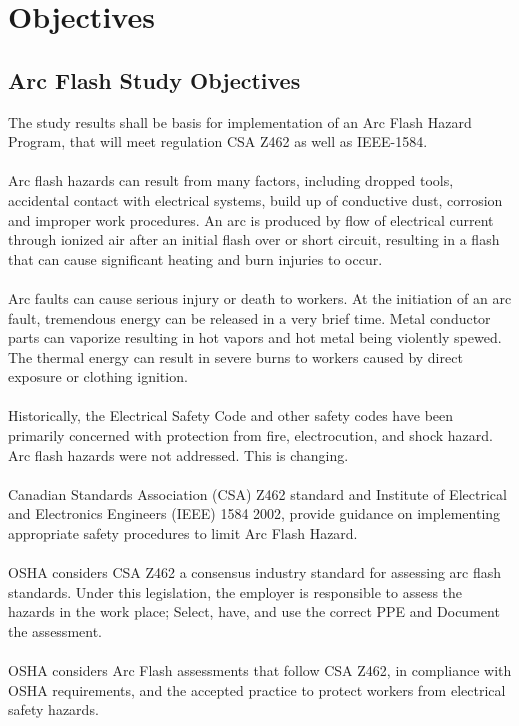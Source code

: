 \section{Objectives}
\label{af:o}

\subsection{Arc Flash Study Objectives}
\label{af:o:afso}

The study results shall be basis for implementation of an Arc Flash Hazard Program, that will meet regulation CSA Z462 as well as IEEE-1584.
\\
\\
Arc flash hazards can result from many factors, including dropped tools, accidental contact with electrical systems, build up of conductive dust, corrosion and improper work procedures. An arc is produced by flow of electrical current through ionized air after an initial flash over or short circuit, resulting in a flash that can cause significant heating and burn injuries to occur. 
\\
\\
Arc faults can cause serious injury or death to workers. At the initiation of an arc fault, tremendous energy can be released in a very brief time. Metal conductor parts can vaporize resulting in hot vapors and hot metal being violently spewed. The thermal energy can result in severe burns to workers caused by direct
exposure or clothing ignition.
\\
\\
Historically, the Electrical Safety Code and other safety codes have been primarily concerned with protection from fire, electrocution, and shock hazard.  Arc flash hazards were not addressed. This is changing.
\\
\\
Canadian Standards Association (CSA) Z462 standard and Institute of Electrical and Electronics Engineers (IEEE) 1584 2002, provide guidance on implementing appropriate safety procedures to limit Arc Flash Hazard.
\\
\\
OSHA considers CSA Z462 a consensus industry standard for assessing arc flash standards. Under this legislation, the employer is responsible to assess the hazards in the work place; Select, have, and use the correct PPE and Document the assessment.
\\
\\
OSHA considers Arc Flash assessments that follow CSA Z462, in compliance with OSHA requirements, and the accepted practice to protect workers from electrical safety hazards.
